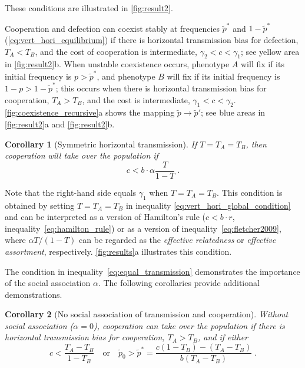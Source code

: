 \documentclass[12pt]{extarticle}
\newtheorem{corollary}{Corollary}
\begin{document}
{These conditions are illustrated in \autoref{fig:result2}.

Cooperation and defection can coexist stably at frequencies $\tilde{p}^*$ and $1-\tilde{p}^*$ (\autoref{eq:vert_hori_equilibrium}) if there is horizontal transmission bias for defection, $T_A<T_B$, and the cost of cooperation is intermediate, $\gamma_2 < c < \gamma_1$; see yellow area in \autoref{fig:result2}b.
When unstable coexistence occurs, phenotype $A$ will fix if its initial frequency is $p>\tilde{p}^*$, and phenotype $B$ will fix if its initial frequency is $1-p>1-\tilde{p}^*$; this occurs when there is horizontal transmission bias for cooperation, $T_A>T_B$, and the cost is intermediate, $\gamma_1 < c < \gamma_2$.
\autoref{fig:coexistence_recursive}a shows the mapping $\tilde p \to \tilde p'$; see blue areas in \autoref{fig:result2}a and \autoref{fig:result2}b.
\\

\begin{corollary}[Symmetric horizontal transmission] 
\label{corollary:equal_transmission}
If $T=T_A=T_B$, then cooperation will take over the population if
\begin{equation}
\label{eq:equal_transmission}
c < b \cdot \alpha \frac{T}{1-T} \;.
\end{equation}
\end{corollary}
Note that the right-hand side equals $\gamma_1$ when $T=T_A=T_B$.
This condition is obtained by setting $T=T_A=T_B$ in inequality \ref{eq:vert_hori_global_condition} and can be interpreted as a version of Hamilton's rule  ($c<b\cdot r$, inequality~\ref{eq:hamilton_rule}) or as a version of inequality~\ref{eq:fletcher2009}, where $\alpha T/(1-T)$ can be regarded as the \emph{effective relatedness} or \emph{effective assortment}, respectively.
\autoref{fig:results}a illustrates this condition. 

The condition in inequality~\ref{eq:equal_transmission} demonstrates the importance of the social association $\alpha$. The following corollaries provide additional demonstrations.
\\

\begin{corollary}[No social association of transmission and cooperation]
\label{corollary:alpha0}
Without social association ($\alpha=0$), cooperation can take over the population if there is horizontal transmission bias for cooperation, $T_A>T_B$, and if either
\begin{equation}
\label{eq:vert_hori_alpha0}
c < \frac{T_A-T_B}{1-T_B}
\quad \text{or} \quad
\tilde{p}_0 > \tilde{p}^* = \frac{c(1-T_B) - (T_A-T_B)}{b (T_A-T_B)} \;.
\end{equation}
\end{corollary}

}
\end{document}
